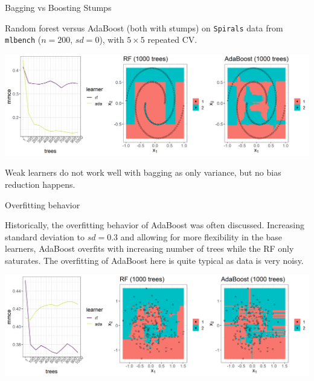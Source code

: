 \documentclass[11pt,compress,t,notes=noshow, xcolor=table]{beamer}
\begin{document}
\begin{vbframe}{Bagging vs Boosting Stumps}

Random forest versus AdaBoost (both with stumps) on \texttt{Spirals} data from 
\texttt{mlbench} ($n=200$, $sd=0$), with $5 \times 5$ repeated CV.


\vfill

\includegraphics[width=\textwidth]{figure/stump_plots.png}

\vfill

Weak learners do not work well with bagging as only variance, but no bias reduction happens.

\end{vbframe}


\begin{vbframe}{Overfitting behavior}

Historically, the overfitting behavior of AdaBoost was often discussed.
Increasing standard deviation to $sd = 0.3$ and allowing for more flexibility in 
the base learners, AdaBoost overfits with increasing number of trees while the 
RF only saturates.
The overfitting of AdaBoost here is quite typical as data is very noisy.

\vfill

\includegraphics[width=\textwidth]{figure/stump_plots_noisy.png}

\end{vbframe}
\end{document}
